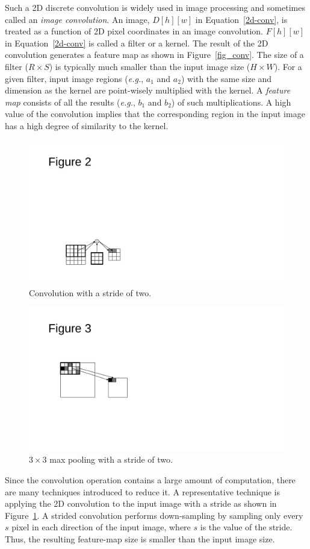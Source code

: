 Such a 2D discrete convolution is widely used in image processing and sometimes called an \textit{image convolution}. An image, $D[h][w]$ in Equation~\ref{2d-conv}, is treated as a function of 2D pixel coordinates in an image convolution. $F[h][w]$ in Equation~\ref{2d-conv} is called a filter or a kernel. The result of the 2D convolution generates a feature map as shown in Figure~\ref{fig_conv}. The size of a filter ($R \times S$) is typically much smaller than the input image size ($H \times W$). For a given filter, input image regions (\textit{e.g.}, $a_1$ and $a_2$) with the same size and dimension as the kernel are point-wisely multiplied with the kernel. A \textit{feature map} consists of all the results (\textit{e.g.}, $b_1$ and $b_2$) of such multiplications. A high value of the convolution implies that the corresponding region in the input image has a high degree of similarity to the kernel. 

\begin{figure}[htbp]
  \centering
  \includegraphics[width=0.5\linewidth]{./figures/stride}
  \caption{Convolution with a stride of two. }
  \label{fig_stride}
\end{figure}

\begin{figure}[htbp]
  \centering
  \includegraphics[width=0.4\linewidth]{./figures/pooling}
  \caption{$3 \times 3$ max pooling with a stride of two. }
  \label{fig_pooling}
\end{figure}

Since the convolution operation contains a large amount of computation, there are many techniques introduced to reduce it. A representative technique is applying the 2D convolution to the input image with a stride as shown in Figure~\ref{fig_stride}. A strided convolution performs down-sampling by sampling only every $s$ pixel in each direction of the input image, where $s$ is the value of the stride. Thus, the resulting feature-map size is smaller than the input image size. 

